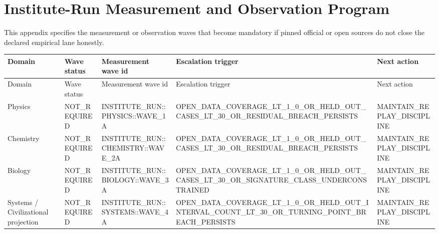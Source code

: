 \section{Institute-Run Measurement and Observation Program}
\label{sec:oc-core-1-3-institute-run-measurement-program}

This appendix specifies the measurement or observation waves that become mandatory if pinned official or open sources do not close the declared empirical lane honestly.

\begin{longtable}{p{}p{}p{}p{}p{}}
\toprule
Domain & Wave status & Measurement wave id & Escalation trigger & Next action \\
\midrule
\endfirsthead
\toprule
Domain & Wave status & Measurement wave id & Escalation trigger & Next action \\
\midrule
\endhead
Physics & NOT\_REQUIRED & INSTITUTE\_RUN::PHYSICS::WAVE\_1A & OPEN\_DATA\_COVERAGE\_LT\_1\_0\_OR\_HELD\_OUT\_CASES\_LT\_30\_OR\_RESIDUAL\_BREACH\_PERSISTS & MAINTAIN\_REPLAY\_DISCIPLINE \\
Chemistry & NOT\_REQUIRED & INSTITUTE\_RUN::CHEMISTRY::WAVE\_2A & OPEN\_DATA\_COVERAGE\_LT\_1\_0\_OR\_HELD\_OUT\_CASES\_LT\_30\_OR\_RESIDUAL\_BREACH\_PERSISTS & MAINTAIN\_REPLAY\_DISCIPLINE \\
Biology & NOT\_REQUIRED & INSTITUTE\_RUN::BIOLOGY::WAVE\_3A & OPEN\_DATA\_COVERAGE\_LT\_1\_0\_OR\_HELD\_OUT\_CASES\_LT\_30\_OR\_SIGNATURE\_CLASS\_UNDERCONSTRAINED & MAINTAIN\_REPLAY\_DISCIPLINE \\
Systems / Civilizational projection & NOT\_REQUIRED & INSTITUTE\_RUN::SYSTEMS::WAVE\_4A & OPEN\_DATA\_COVERAGE\_LT\_1\_0\_OR\_HELD\_OUT\_INTERVAL\_COUNT\_LT\_30\_OR\_TURNING\_POINT\_BREACH\_PERSISTS & MAINTAIN\_REPLAY\_DISCIPLINE \\
\bottomrule
\end{longtable}
